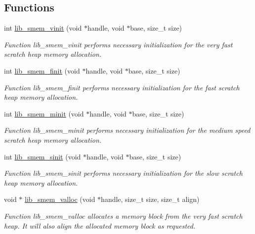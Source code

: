 \subsection*{Functions}
\begin{DoxyCompactItemize}
\item 
int \hyperlink{group__libarch__memmgt_gaeeb7c8294fcd4640e4eaf7a741397032}{lib\+\_\+smem\+\_\+vinit} (void $\ast$handle, void $\ast$base, size\+\_\+t size)
\begin{DoxyCompactList}\small\item\em Function lib\+\_\+smem\+\_\+vinit performs necessary initialization for the very fast scratch heap memory allocation. \end{DoxyCompactList}\item 
int \hyperlink{group__libarch__memmgt_gadd591cf0185afae77c89e62a35af6395}{lib\+\_\+smem\+\_\+finit} (void $\ast$handle, void $\ast$base, size\+\_\+t size)
\begin{DoxyCompactList}\small\item\em Function lib\+\_\+smem\+\_\+finit performs necessary initialization for the fast scratch heap memory allocation. \end{DoxyCompactList}\item 
int \hyperlink{group__libarch__memmgt_ga991a1c6d4b40f4b4750c7fd1f8aa73f6}{lib\+\_\+smem\+\_\+minit} (void $\ast$handle, void $\ast$base, size\+\_\+t size)
\begin{DoxyCompactList}\small\item\em Function lib\+\_\+smem\+\_\+minit performs necessary initialization for the medium speed scratch heap memory allocation. \end{DoxyCompactList}\item 
int \hyperlink{group__libarch__memmgt_ga1dd9ae589bdfe68ced145885ea4c4789}{lib\+\_\+smem\+\_\+sinit} (void $\ast$handle, void $\ast$base, size\+\_\+t size)
\begin{DoxyCompactList}\small\item\em Function lib\+\_\+smem\+\_\+sinit performs necessary initialization for the slow scratch heap memory allocation. \end{DoxyCompactList}\item 
void $\ast$ \hyperlink{group__libarch__memmgt_ga24093174e441c683650863236dcb9806}{lib\+\_\+smem\+\_\+valloc} (void $\ast$handle, size\+\_\+t size, size\+\_\+t align)
\begin{DoxyCompactList}\small\item\em Function lib\+\_\+smem\+\_\+valloc allocates a memory block from the very fast scratch heap. It will also align the allocated memory block as requested. \end{DoxyCompactList}\item 

\end{DoxyCompactItemize}
